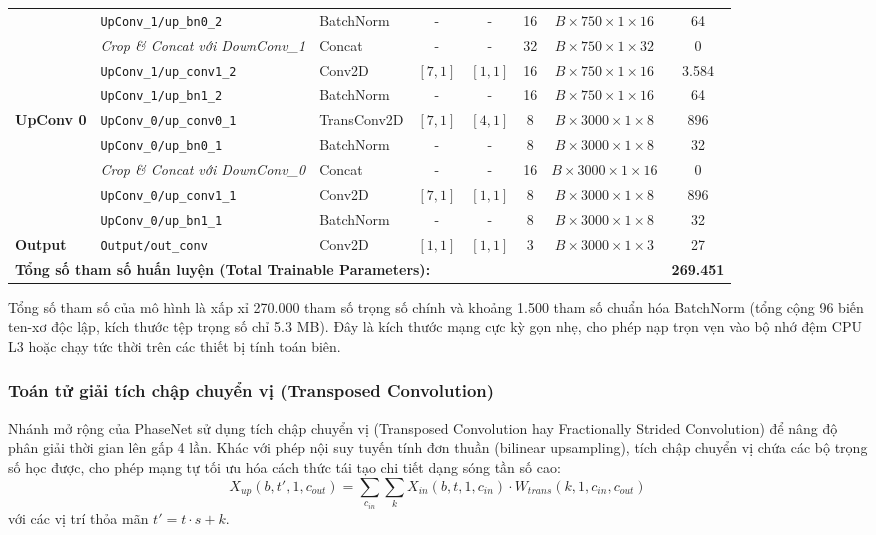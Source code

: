 \documentclass[preprint,1p]{elsarticle}
\begin{document}
\begin{table}[htbp]
\begin{tabular}{lllccccc}
& \texttt{UpConv\_1/up\_bn0\_2} & BatchNorm & - & - & 16 & $B \times 750 \times 1 \times 16$ & 64 \\
& \textit{Crop \& Concat với DownConv\_1} & Concat & - & - & 32 & $B \times 750 \times 1 \times 32$ & 0 \\
& \texttt{UpConv\_1/up\_conv1\_2} & Conv2D & $[7, 1]$ & $[1, 1]$ & 16 & $B \times 750 \times 1 \times 16$ & 3.584 \\
& \texttt{UpConv\_1/up\_bn1\_2} & BatchNorm & - & - & 16 & $B \times 750 \times 1 \times 16$ & 64 \\
\midrule
\textbf{UpConv 0} & \texttt{UpConv\_0/up\_conv0\_1} & TransConv2D & $[7, 1]$ & $[4, 1]$ & 8 & $B \times 3000 \times 1 \times 8$ & 896 \\
& \texttt{UpConv\_0/up\_bn0\_1} & BatchNorm & - & - & 8 & $B \times 3000 \times 1 \times 8$ & 32 \\
& \textit{Crop \& Concat với DownConv\_0} & Concat & - & - & 16 & $B \times 3000 \times 1 \times 16$ & 0 \\
& \texttt{UpConv\_0/up\_conv1\_1} & Conv2D & $[7, 1]$ & $[1, 1]$ & 8 & $B \times 3000 \times 1 \times 8$ & 896 \\
& \texttt{UpConv\_0/up\_bn1\_1} & BatchNorm & - & - & 8 & $B \times 3000 \times 1 \times 8$ & 32 \\
\midrule
\textbf{Output} & \texttt{Output/out\_conv} & Conv2D & $[1, 1]$ & $[1, 1]$ & 3 & $B \times 3000 \times 1 \times 3$ & 27 \\
\midrule
\multicolumn{6}{l}{\textbf{Tổng số tham số huấn luyện (Total Trainable Parameters):}} & & \textbf{269.451} \\
\bottomrule
\end{tabular}
\end{table}

Tổng số tham số của mô hình là xấp xỉ 270.000 tham số trọng số chính và khoảng 1.500 tham số chuẩn hóa BatchNorm (tổng cộng 96 biến ten-xơ độc lập, kích thước tệp trọng số chỉ 5.3 MB). Đây là kích thước mạng cực kỳ gọn nhẹ, cho phép nạp trọn vẹn vào bộ nhớ đệm CPU L3 hoặc chạy tức thời trên các thiết bị tính toán biên.

\subsubsection{Toán tử giải tích chập chuyển vị (Transposed Convolution)}
Nhánh mở rộng của PhaseNet sử dụng tích chập chuyển vị (Transposed Convolution hay Fractionally Strided Convolution) để nâng độ phân giải thời gian lên gấp 4 lần. Khác với phép nội suy tuyến tính đơn thuần (bilinear upsampling), tích chập chuyển vị chứa các bộ trọng số học được, cho phép mạng tự tối ưu hóa cách thức tái tạo chi tiết dạng sóng tần số cao:
\begin{equation}
X_{up}(b, t', 1, c_{out}) = \sum_{c_{in}} \sum_{k} X_{in}(b, t, 1, c_{in}) \cdot W_{trans}(k, 1, c_{in}, c_{out})
\label{eq:transconv}
\end{equation}
với các vị trí thỏa mãn $t' = t \cdot s + k$.
\end{document}
